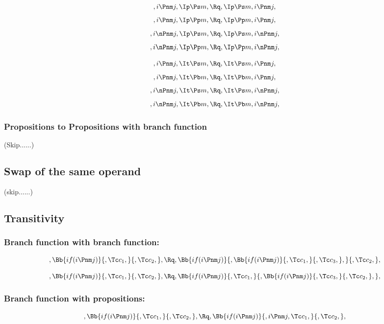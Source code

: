 \[,i \Pnm j, \Ip \Ps m, \Rq , \Ip \Ps m, i \Pnm j,\]
\[,i \Pnm j, \Ip \Pp m, \Rq , \Ip \Pp m, i \Pnm j,\]
\[,i \nPnm j,\Ip \Ps m, \Rq , \Ip \Ps m, i \nPnm j,\]
\[,i \nPnm j, \Ip \Pp m, \Rq , \Ip \Pp m, i \nPnm j,\]

\[,i \Pnm j, \It \Ps m, \Rq , \It \Ps m, i \Pnm j,\]
\[,i \Pnm j, \It \Pb m, \Rq , \It \Pb m, i \Pnm j,\]
\[,i \nPnm j,\It \Ps m, \Rq , \It \Ps m, i \nPnm j,\]
\[,i \nPnm j, \It \Pb m, \Rq , \It \Pb m, i \nPnm j,\]







\bigskip
\bigskip
\bigskip
\bigskip
\subsubsection{ Propositions to Propositions with branch function}
(Skip......)



\bigskip
\bigskip
\bigskip
\bigskip
\subsection{ Swap  of the same operand}
(skip......)





\bigskip
\bigskip
\bigskip
\bigskip
\subsection{Transitivity}
\subsubsection{Branch function with branch function:}
\[, \Bb{if(i \Pnm j)}{,\Tc c_1,}{,\Tc c_2,}, \Rq , \Bb{if(i \Pnm j)}{,\Bb{if(i \Pnm j)}{,\Tc c_1,}{,\Tc c_3,},}{,\Tc c_2,},\]

\bigskip
\bigskip
\bigskip
\bigskip





\bigskip
\bigskip
\bigskip
\bigskip
\[, \Bb{if(i \Pnm j)}{,\Tc c_1,}{,\Tc c_2,}, \Rq , \Bb{if(i \Pnm j)}{,\Tc c_1,}{,\Bb{if(i \Pnm j)}{,\Tc c_3,}{,\Tc c_2,},},\]
\bigskip
\bigskip
\bigskip
\bigskip






\bigskip
\bigskip
\bigskip
\bigskip
\subsubsection{Branch function with propositions:}
\[, \Bb{if(i \Pnm j)}{,\Tc c_1,}{,\Tc c_2,}, \Rq , \Bb{if(i \Pnm j)}{,i \Pnm j,\Tc c_1,}{,\Tc c_2,},\]

